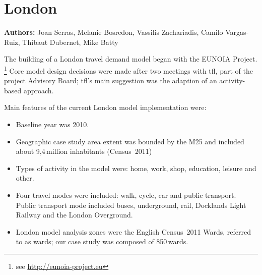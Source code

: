 \chapter{London}
\label{ch:london}
\hfill \textbf{Authors:} Joan Serras, Melanie Bosredon, Vassilis Zachariadis, Camilo Vargas-Ruiz, Thibaut Dubernet, Mike Batty


The building of a London travel demand model began with the EUNOIA Project.%
\footnote{see \url{http://eunoia-project.eu}} 
Core model design decisions were made after two meetings with \gls{tfl}, part of the project Advisory Board; 
\gls{tfl}'s main suggestion was the adaption of an activity-based approach.

Main features of the current London model implementation were:
%
\begin{itemize}\styleItemize
\item     Baseline year was 2010.
\item	Geographic case study area extent was bounded by the M25 and included about 9,4\,million inhabitants (Census~2011)
\item	Types of activity in the model were: home, work, shop, education, leisure and other.
\item	Four travel modes were included: walk, cycle, car and public transport. Public transport mode included buses, underground, rail, Docklands Light Railway and the London Overground.
\item	 London model analysis zones were the English Census~2011 Wards, referred to as wards; our case study was composed of 850\,wards.
\end{itemize}
%
